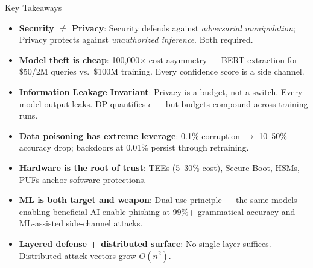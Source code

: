 \documentclass[aspectratio=169, 12pt]{beamer}
\begin{document}
\begin{frame}{Key Takeaways}

\scriptsize
\begin{itemize}\setlength\itemsep{1pt}
  \item \textbf{Security $\neq$ Privacy}: Security defends against \emph{adversarial manipulation}; Privacy protects against \emph{unauthorized inference}. Both required.
  \item \textbf{Model theft is cheap}: 100,000$\times$ cost asymmetry --- BERT extraction for \$50/2M queries vs.\ \$100M training. Every confidence score is a side channel.
  \item \textbf{Information Leakage Invariant}: Privacy is a budget, not a switch. Every model output leaks. DP quantifies $\epsilon$ --- but budgets compound across training runs.
  \item \textbf{Data poisoning has extreme leverage}: 0.1\% corruption $\to$ 10--50\% accuracy drop; backdoors at 0.01\% persist through retraining.
  \item \textbf{Hardware is the root of trust}: TEEs (5--30\% cost), Secure Boot, HSMs, PUFs anchor software protections.
  \item \textbf{ML is both target and weapon}: Dual-use principle --- the same models enabling beneficial AI enable phishing at 99\%+ grammatical accuracy and ML-assisted side-channel attacks.
  \item \textbf{Layered defense + distributed surface}: No single layer suffices. Distributed attack vectors grow $O(n^2)$.
\end{itemize}

\end{frame}
\end{document}
